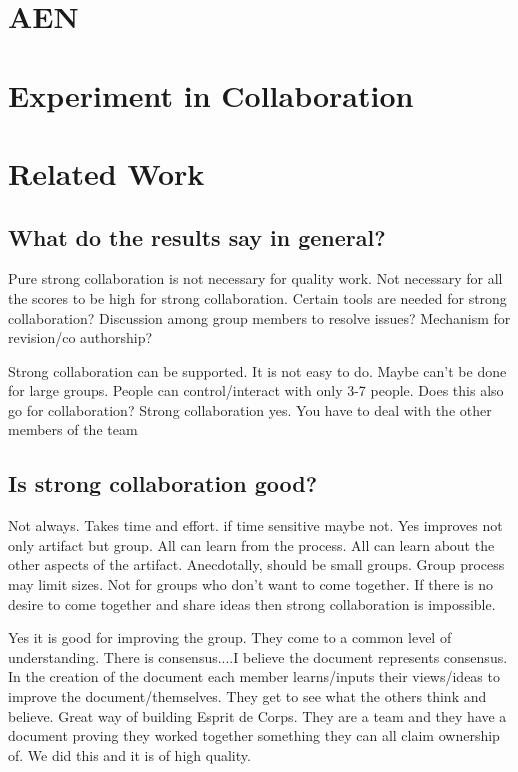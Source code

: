 \section{AEN}

\section{Experiment in Collaboration}

\section{Related Work}


\subsection{What do the results say in general?}

Pure strong collaboration is not necessary for quality work.  Not necessary
for all the scores to be high for strong collaboration.  Certain tools are
needed for strong collaboration?  Discussion among group members to resolve
issues?  Mechanism for revision/co authorship? 

Strong collaboration can be supported.  It is not easy to do.  Maybe can't
be done for large groups.  People can control/interact with only 3-7
people.  Does this also go for collaboration?  Strong collaboration yes.
You have to deal with the other members of the team

\subsection{Is strong collaboration good?}

Not always.  Takes time and effort.  if time sensitive maybe not.  Yes
improves not only artifact but group.  All can learn from the process.  All
can learn about the other aspects of the artifact.  Anecdotally, should be
small groups.  Group process may limit sizes.
Not for groups who don't want to come together.  If there is no desire to
come together and share ideas then strong collaboration is impossible.

Yes it is good for improving the group.  They come to a common level of
understanding.  There is consensus....I believe the document represents
consensus.  In the creation of the document each member learns/inputs their
views/ideas to improve the document/themselves.  They get to see what the
others think and believe.  Great way of building Esprit de Corps.  They are
a team and they have a document proving they worked together something they
can all claim ownership of.  We did this and it is of high quality.


